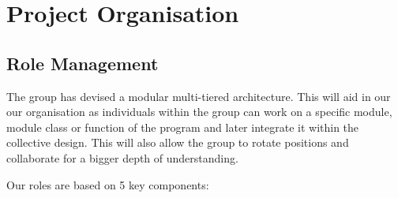 \documentclass[11pt]{article}
\begin{document}
\section{Project Organisation}

\subsection{Role Management}

The group has devised a modular multi-tiered architecture. This will aid in our our organisation as individuals within the group can work on a specific module, module class or function of the program and later integrate it within the collective design. This will also allow the group to rotate positions and collaborate for a bigger depth of understanding.


Our roles are based on 5 key components:
\end{document}
